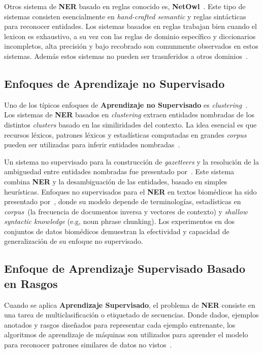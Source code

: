 Otros sistema de \textbf{NER} basado en reglas conocido es, \textbf{NetOwl}~\cite{krupka2005description}. Este tipo de sistemas consisten esencialmente en \emph{hand-crafted semantic} y reglas sint\'acticas para reconocer entidades. Los sistemas basados en reglas trabajan bien cuando el lexicon es exhaustivo, a su vez con las reglas de dominio espec\'ifico y diccionarios incompletos, alta precisi\'on y bajo recobrado son comunmente observados en estos sistemas. Adem\'as estos sistemas no pueden ser trasnferidos a otros dominios~\cite{li2018survey}.


\subsection{Enfoques de Aprendizaje no Supervisado}  

Uno de los t\'ipicos enfoques de \textbf{Aprendizaje no Supervisado} es \emph{clustering}~\cite{nadeau2007survey}. Los sistemas de \textbf{NER} basados en \emph{clustering} extraen entidades nombradas de los distintos \emph{clusters} basado en las similiridades del contexto. La idea esencial es que recursos l\'exicos, patrones l\'exicos y estad\'isticas computadas en grandes \emph{corpus} pueden ser utilizadas para inferir entidades nombradas~\cite{li2018survey}.

Un sistema no supervisado para la construcci\'on de \emph{gazetteers} y la resoluci\'on de la ambiguedad entre entidades nombradas fue presentado por~\cite{nadeau2006unsupervised}. Este sistema combina \textbf{NER} y la 
desambiguación de las entidades, basado en simples heur\'isticas. Enfoques no supervisados para el \textbf{NER} en textos biom\'edicos ha sido presentado por~\cite{zhang2013unsupervised}, donde su modelo depende de terminolog\'ias, estad\'isticas en \emph{corpus}~(la frecuencia de documentos inversa y vectores de contexto) y \emph{shallow syntactic knowledge} (e.g, noun phrase chunking). Los experimentos en dos conjuntos de datos biom\'edicos demuestran la efectividad y capacidad de generalizaci\'on de su enfoque no supervisado.


\subsection{Enfoque de Aprendizaje Supervisado Basado en Rasgos}

Cuando se aplica \textbf{Aprendizaje Supervisado}, el problema de \textbf{NER} consiste en una tarea de multiclasificaci\'on o etiquetado de secuencias. Donde dados, ejemplos anotados y rasgos dise\~nados para representar cada ejemplo entrenante, los algoritmos de aprendizaje de m\'aquinas son utilizados para aprender el modelo para reconocer patrones similares de datos no vistos~\cite{li2018survey}.

